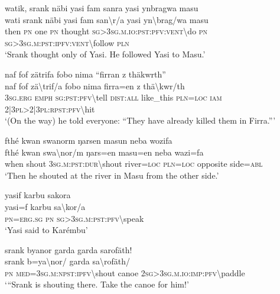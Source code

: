 \ea\label{ex:4:a1703}
watik, srank näbi yasi fam sanra yasi ynbragwa masu\\
\gll wati	srank	näbi	yasi	fam	san{\textbackslash}r/a	yasi	yn{\textbackslash}brag/wa	masu\\
     then	\textsc{pn}	one	\textsc{pn}	thought	\textsc{sg}>3\textsc{sg}.\textsc{m}.\textsc{io}:\textsc{pst}:\textsc{pfv}:\textsc{vent}{\textbackslash}do	\textsc{pn}	\textsc{sg}>3\textsc{sg}.\textsc{m}:\textsc{pst}:\textsc{ipfv}:\textsc{vent}{\textbackslash}follow	\textsc{pln}\\
\glt `Srank thought only of Yasi. He followed Yasi to Masu.'
\z

\ea\label{ex:4:a1704}
naf fof zätrifa fobo nima ``firran z thäkwrth''\\
\gll naf	fof	zä{\textbackslash}trif/a	fobo	nima	firra=en	z	thä{\textbackslash}kwr/th\\
     3\textsc{sg}.\textsc{erg}	\textsc{emph}	\textsc{sg}:\textsc{pst}:\textsc{pfv}{\textbackslash}tell	\textsc{dist}:\textsc{all}	like\_this	\textsc{pln}=\textsc{loc}	\textsc{iam}	2|3\textsc{pl}>2|3\textsc{pl}:\textsc{rpst}:\textsc{pfv}{\textbackslash}hit\\
\glt `(On the way) he told everyone: ``They have already killed them in Firra.'''
\z

\ea\label{ex:4:a1705}
fthé kwan swanorm ŋarsen masun neba wozifa\\
\gll fthé	kwan	swa{\textbackslash}nor/m	ŋars=en	masu=en	neba	wazi=fa\\
     when	shout	3\textsc{sg}.\textsc{m}:\textsc{pst}:\textsc{dur}{\textbackslash}shout	river=\textsc{loc}	\textsc{pln}=\textsc{loc}	opposite	side=\textsc{abl}\\
\glt `Then he shouted at the river in Masu from the other side.'
\z

\ea\label{ex:4:a1707}
yasif karbu sakora\\
\gll yasi=f	karbu	sa{\textbackslash}kor/a\\
     \textsc{pn}=\textsc{erg}.\textsc{sg}	\textsc{pn}	\textsc{sg}>3\textsc{sg}.\textsc{m}:\textsc{pst}:\textsc{pfv}{\textbackslash}speak\\
\glt `Yasi said to Karémbu'
\z

\ea\label{ex:4:a1708}
srank byanor garda garda sarofäth!\\
\gll srank	b=ya{\textbackslash}nor/	garda	sa{\textbackslash}rofäth/\\
     \textsc{pn}	\textsc{med}=3\textsc{sg}.\textsc{m}:\textsc{npst}:\textsc{ipfv}{\textbackslash}shout	canoe	2\textsc{sg}>3\textsc{sg}.\textsc{m}.\textsc{io}:\textsc{imp}:\textsc{pfv}{\textbackslash}paddle\\
\glt `{``}Srank is shouting there. Take the canoe for him!'
\z


